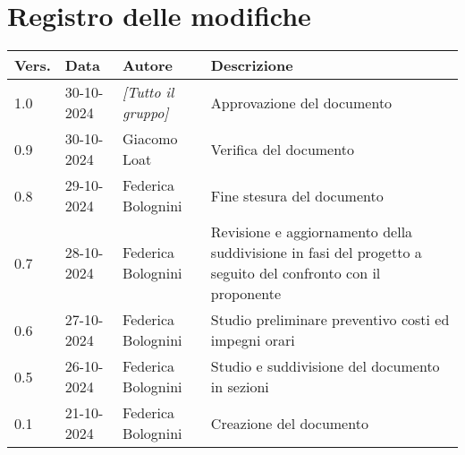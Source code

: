 \section*{Registro delle modifiche}

\begin{table}[h]
    \centering
    \begin{tabular}{|l|l|l|p{5cm}|}
        \hline
        \rowcolor[gray]{0.9}
        \textbf{Vers.} & \textbf{Data} & \textbf{Autore} & \textbf{Descrizione}\\
        \hline
        1.0 & 30-10-2024 & \emph{[Tutto il gruppo]} & Approvazione del documento\\
        \hline
        0.9 & 30-10-2024 & Giacomo Loat & Verifica del documento\\
        \hline
        0.8 & 29-10-2024 & Federica Bolognini & Fine stesura del documento\\
        \hline
        0.7 & 28-10-2024 & Federica Bolognini & Revisione e aggiornamento della suddivisione in fasi del progetto a seguito del confronto con il proponente\\
        \hline
        0.6 & 27-10-2024 & Federica Bolognini & Studio preliminare preventivo costi ed impegni orari\\
        \hline
        0.5 & 26-10-2024 & Federica Bolognini & Studio e suddivisione del documento in sezioni\\
        \hline
        0.1 & 21-10-2024 & Federica Bolognini & Creazione del documento\\
        \hline
    \end{tabular}
\end{table}
